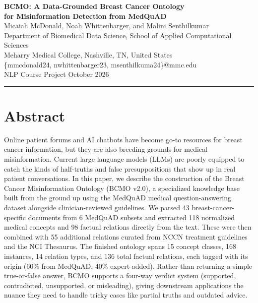 \documentclass[10pt,a4paper]{article}
\begin{document}
\begin{center}
    {\Large\bfseries BCMO: A Data-Grounded Breast Cancer Ontology \\[2pt]
    for Misinformation Detection from MedQuAD}\\[6pt]
    {\normalsize
        Micaiah McDonald,
        Noah Whittenbarger,
        and Malini Senthilkumar}\\[3pt]
    {\small Department of Biomedical Data Science, School of Applied Computational Sciences\\
    Meharry Medical College, Nashville, TN, United States}\\[2pt]
    {\small \{mmcdonald24, nwhittenbarger23, msenthilkuma24\}@mmc.edu}\\[6pt]
    {\normalsize NLP Course Project \hfill October 2026}
\end{center}
\vspace{2pt}
\hrule
\vspace{4pt}

\section{Abstract}

Online patient forums and AI chatbots have become go-to resources for breast cancer information, but they are also breeding grounds for medical misinformation. Current large language models (LLMs) are poorly equipped to catch the kinds of half-truths and false presuppositions that show up in real patient conversations. In this paper, we describe the construction of the Breast Cancer Misinformation Ontology (BCMO v2.0), a specialized knowledge base built from the ground up using the MedQuAD medical question-answering dataset alongside clinician-reviewed guidelines. We parsed 43 breast-cancer-specific documents from 6 MedQuAD subsets and extracted 118 normalized medical concepts and 98 factual relations directly from the text. These were then combined with 55 additional relations curated from NCCN treatment guidelines and the NCI Thesaurus. The finished ontology spans 15 concept classes, 168 instances, 14 relation types, and 136 total factual relations, each tagged with its origin (60\% from MedQuAD, 40\% expert-added). Rather than returning a simple true-or-false answer, BCMO supports a four-way verdict system (supported, contradicted, unsupported, or misleading), giving downstream applications the nuance they need to handle tricky cases like partial truths and outdated advice.
\end{document}
